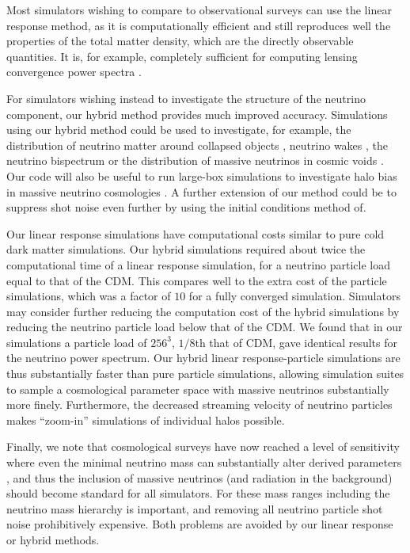 \documentclass[useAMS, usenatbib]{mnras}
\begin{document}
Most simulators wishing to compare to observational surveys can use the linear response method, as it is computationally efficient and still reproduces well the properties of the total matter density, which are the directly observable quantities. It is, for example, completely sufficient for computing lensing convergence power spectra \citep{McCarthy_2018, Liu_2017}.

For simulators wishing instead to investigate the structure of the neutrino component, our hybrid method provides much improved accuracy. Simulations using our hybrid method could be used to investigate, for example, the distribution of neutrino matter around collapsed objects \citep{FVN_2013}, neutrino wakes \citep{Inman_2015}, the neutrino bispectrum \citep{Furhrer_2015} or the distribution of massive neutrinos in cosmic voids \citep{Banerjee_2016}. Our code will also be useful to run large-box simulations to investigate halo bias in massive neutrino cosmologies \citep{Loverde_14, Chiang_17}. A further extension of our method could be to suppress shot noise even further by using the initial conditions method of\cite{Banerjee_2018}.

Our linear response simulations have computational costs similar to pure cold dark matter simulations. Our hybrid simulations required about twice the computational time of a linear response simulation, for a neutrino particle load equal to that of the CDM. This compares well to the extra cost of the particle simulations, which was a factor of $10$ for a fully converged simulation. Simulators may consider further reducing the computation cost of the hybrid simulations by reducing the neutrino particle load below that of the CDM. We found that in our simulations a particle load of $256^3$, $1/8$th that of CDM, gave identical results for the neutrino power spectrum. Our hybrid linear response-particle simulations are thus substantially faster than pure particle simulations, allowing simulation suites to sample a cosmological parameter space with massive neutrinos substantially more finely. Furthermore, the decreased streaming velocity of neutrino particles makes ``zoom-in'' simulations of individual halos possible.

Finally, we note that cosmological surveys have now reached a level of sensitivity where even the minimal neutrino mass can substantially alter derived parameters \citep{Calabrese_2017}, and thus the inclusion of massive neutrinos (and radiation in the background) should become standard for all simulators. For these mass ranges including the neutrino mass hierarchy is important, and removing all neutrino particle shot noise prohibitively expensive. Both problems are avoided by our linear response or hybrid methods.
\end{document}
